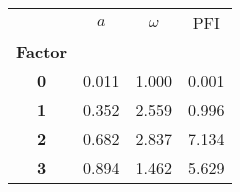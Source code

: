 \begin{tabular}{cccc}
\toprule
{} &   $a$ &  $\omega$ &   PFI \\
\textbf{Factor} &       &           &       \\
\midrule
\textbf{0     } & 0.011 &     1.000 & 0.001 \\
\textbf{1     } & 0.352 &     2.559 & 0.996 \\
\textbf{2     } & 0.682 &     2.837 & 7.134 \\
\textbf{3     } & 0.894 &     1.462 & 5.629 \\
\bottomrule
\end{tabular}
